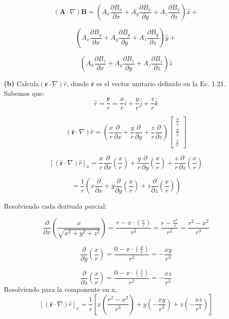 \documentclass[12pt]{article}
\begin{document}
\[(\mathbf{A} \cdot \nabla) \mathbf{B} = \left( A_x \frac{\partial B_x}{\partial x} + A_y \frac{\partial B_x}{\partial y} + A_z \frac{\partial B_x}{\partial z} \right) \hat{x} +
\]

\[
\left( A_x \frac{\partial B_y}{\partial x} + A_y \frac{\partial B_y}{\partial y} + A_z \frac{\partial B_y}{\partial z} \right) \hat{y} +
\]

\[
\left( A_x \frac{\partial B_z}{\partial x} + A_y \frac{\partial B_z}{\partial y} + A_z \frac{\partial B_z}{\partial z} \right) \hat{z}
\]

\textbf{(b)} Calcula\quad \( (\mathbf{r} \cdot \nabla) \hat{r} \), donde \(\hat{\mathbf{r}}\) es el vector unitario definido en la Ec. 1.21.\\

Sabemos que:
\[
\hat{r} = \frac{\mathbf{r}}{r} = \frac{x}{r} \hat{i} + \frac{y}{r} \hat{j} + \frac{z}{r} \hat{k}
\]

\[
( \hat{\mathbf{r}} \cdot \nabla) \hat{r} = \left( \frac{x}{r} \frac{\partial}{\partial x} + \frac{y}{r} \frac{\partial}{\partial y} + \frac{z}{r} \frac{\partial}{\partial z} \right) 
\begin{bmatrix} \frac{x}{r} \\ \frac{y}{r} \\ \frac{z}{r} \end{bmatrix}
\]

\[
[(\hat{\mathbf{r}} \cdot \nabla) \hat{r}]_x = \frac{x}{r} \frac{\partial}{\partial x} \left( \frac{x}{r} \right) + \frac{y}{r} \frac{\partial}{\partial y} \left( \frac{x}{r} \right) + \frac{z}{r} \frac{\partial}{\partial z} \left( \frac{x}{r} \right)
\]

\[
= \frac{1}{r}\left( x \frac{\partial }{\partial x} + y \frac{\partial}{\partial y} \left( \frac{x}{r} \right) + z \frac{\partial}{\partial z} \left( \frac{x}{r} \right)\right)
\]

Resolviendo cada derivada parcial:

\[
\frac{\partial}{\partial x} \left( \frac{x}{\sqrt{x^2 + y^2 + z^2}} \right) = \frac{r - x \cdot \left( \frac{x}{r} \right)}{r^2} = \frac{r - \frac{x^2}{r}}{r^2} = \frac{r^2 -x^2}{r^3}
\]

\[
\frac{\partial}{\partial y} \left( \frac{x}{r} \right) =\frac{ 0 - x \cdot \left( \frac{y}{r} \right)}{r^2} = -\frac{xy}{r^3}
\]

\[
\frac{\partial}{\partial z} \left( \frac{x}{r} \right) =\frac{ 0 - x \cdot \left( \frac{z}{r} \right)}{r^2} = -\frac{xz}{r^3}
\]
Resolviendo para la componente en x,
\[
[(\hat{\mathbf{r}} \cdot \nabla) \hat{r}]_x = \frac{1}{r} \left[ x \left( \frac{r^2 -x^2}{r^3} \right) + y \left( -\frac{xy}{r^3} \right) + z \left( -\frac{xz}{r^3} \right) \right]
\]
\end{document}
